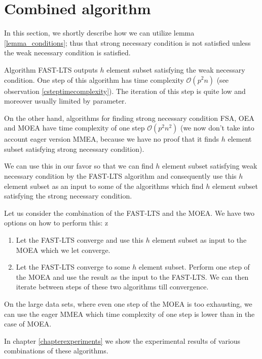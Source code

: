 \section{Combined algorithm} \label{sectioncombined}
In this section, we shortly describe how we can utilize lemma \ref{lemma_conditions}; thus that strong necessary condition is not satisfied unless the weak necessary condition is satisfied.

Algorithm FAST-LTS outputs $h$ element subset satisfying the weak necessary condition. One step of this algorithm has time complexity $\mathcal{O}(p^2n)$ (see observation \ref{csteptimecomplexity}). The iteration of this step is quite low and moreover usually limited by parameter. 

On the other hand, algorithms for finding strong necessary condition FSA, OEA and MOEA have time complexity of one step $\mathcal{O}(p^2n^2)$ (we now don't take into account eager version MMEA, because we have no proof that it finds $h$ element subset satisfying strong necessary condition). 

We can use this in our favor so that we can find $h$ element subset satisfying weak necessary condition by the FAST-LTS algorithm and consequently use this $h$ element subset as an input to some of the algorithms which find $h$ element subset satisfying the strong necessary condition.

Let us consider the combination of the FAST-LTS and the MOEA. We have two options on how to perform this:
z
\begin{enumerate}
    \item Let the FAST-LTS converge and use this $h$ element subset as input to the MOEA which we let converge.
    \item Let the FAST-LTS converge to some $h$ element subset. Perform one step of the MOEA and use the result as the input to the FAST-LTS. We can then iterate between steps of these two algorithms till convergence.
\end{enumerate}

On the large data sets, where even one step of the MOEA is too exhausting, we can use the eager MMEA which time complexity of one step is lower than in the case of MOEA.

In chapter \ref{chapterexperiments} we show the experimental results of various combinations of these algorithms.





